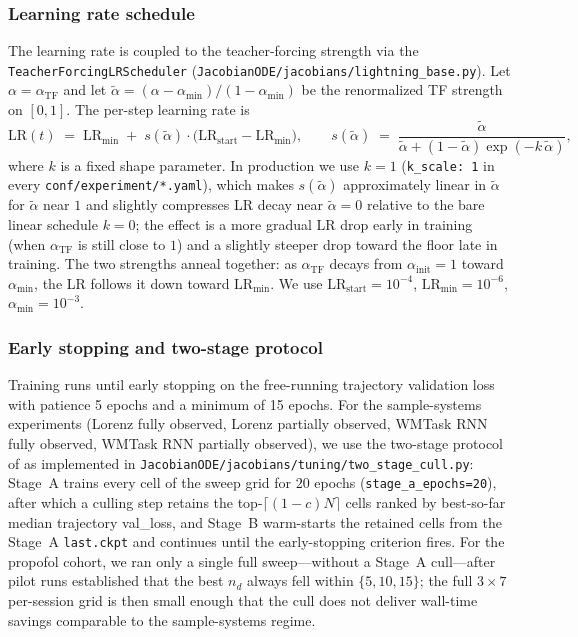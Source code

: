 \subsubsection{Learning rate schedule}\label{supp:interareal-control-lr}

The learning rate is coupled to the teacher-forcing strength via the \texttt{TeacherForcingLRScheduler} (\texttt{JacobianODE/jacobians/lightning\_base.py}). Let $\alpha=\alpha_{\mathrm{TF}}$ and let $\tilde{\alpha}=(\alpha-\alpha_{\min})/(1-\alpha_{\min})$ be the renormalized TF strength on $[0,1]$. The per-step learning rate is
\begin{equation}
\mathrm{LR}(t) \;=\; \mathrm{LR}_{\min} \;+\; s(\tilde{\alpha})\cdot\bigl(\mathrm{LR}_{\mathrm{start}}-\mathrm{LR}_{\min}\bigr),\qquad s(\tilde{\alpha})\;=\;\frac{\tilde{\alpha}}{\tilde{\alpha}+(1-\tilde{\alpha})\exp(-k\,\tilde{\alpha})},
\end{equation}
where $k$ is a fixed shape parameter. In production we use $k=1$ (\texttt{k\_scale: 1} in every \texttt{conf/experiment/*.yaml}), which makes $s(\tilde{\alpha})$ approximately linear in $\tilde{\alpha}$ for $\tilde{\alpha}$ near $1$ and slightly compresses LR decay near $\tilde{\alpha}=0$ relative to the bare linear schedule $k=0$; the effect is a more gradual LR drop early in training (when $\alpha_{\mathrm{TF}}$ is still close to $1$) and a slightly steeper drop toward the floor late in training. The two strengths anneal together: as $\alpha_{\mathrm{TF}}$ decays from $\alpha_{\mathrm{init}}=1$ toward $\alpha_{\min}$, the LR follows it down toward $\mathrm{LR}_{\min}$. We use $\mathrm{LR}_{\mathrm{start}}=10^{-4}$, $\mathrm{LR}_{\min}=10^{-6}$, $\alpha_{\min}=10^{-3}$.

\subsubsection{Early stopping and two-stage protocol}\label{supp:interareal-control-earlystop}

Training runs until early stopping on the free-running trajectory validation loss with patience 5 epochs and a minimum of 15 epochs. For the sample-systems experiments (Lorenz fully observed, Lorenz partially observed, WMTask RNN fully observed, WMTask RNN partially observed), we use the two-stage protocol of \cite{Eisen2025-wt} as implemented in \texttt{JacobianODE/jacobians/tuning/two\_stage\_cull.py}: Stage~A trains every cell of the sweep grid for $20$ epochs (\texttt{stage\_a\_epochs=20}), after which a culling step retains the top-$\lceil(1-c)N\rceil$ cells ranked by best-so-far median trajectory val\_loss, and Stage~B warm-starts the retained cells from the Stage~A \texttt{last.ckpt} and continues until the early-stopping criterion fires. For the propofol cohort, we ran only a single full sweep---without a Stage~A cull---after pilot runs established that the best $n_{d}$ always fell within $\{5,10,15\}$; the full $3\times 7$ per-session grid is then small enough that the cull does not deliver wall-time savings comparable to the sample-systems regime.

